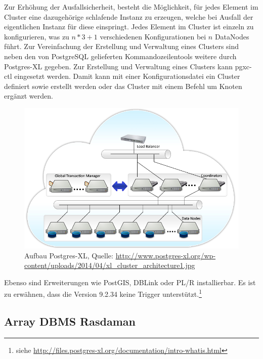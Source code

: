 Zur Erhöhung der Ausfallsicherheit, besteht die Möglichkeit, für jedes Element im Cluster eine dazugehörige schlafende Instanz zu erzeugen, welche bei Ausfall der eigentlichen Instanz für diese einspringt.
Jedes Element im Cluster ist einzeln zu konfigurieren, was zu $ n*3+1 $ verschiedenen Konfigurationen bei $n$ DataNodes führt.
Zur Vereinfachung der Erstellung und Verwaltung eines Clusters sind neben den von PostgreSQL gelieferten Kommandozeilentools weitere durch Postgres-XL gegeben.
Zur Erstellung und Verwaltung eines Clusters kann pgxc-ctl eingesetzt werden.
Damit kann mit einer Konfigurationsdatei ein Cluster definiert sowie erstellt werden oder das Cluster mit einem Befehl um Knoten ergänzt werden.
\begin{figure}[h!]
\centering
\includegraphics[width=.7\textwidth]{Abbildungen/postgresxl-structure.jpg}
\caption[Aufbau Postgres-XL]{Aufbau Postgres-XL, Quelle: \url{http://www.postgres-xl.org/wp-content/uploads/2014/04/xl_cluster_architecture1.jpg}}
\label{fig:postgresxl}
\end{figure}
Ebenso sind Erweiterungen wie PostGIS, DBLink oder PL/R installierbar.
Es ist zu erwähnen, dass die Version 9.2.34 keine Trigger unterstützt.\footnote{siehe \url{http://files.postgres-xl.org/documentation/intro-whatis.html}}

\subsection{Array DBMS Rasdaman}

